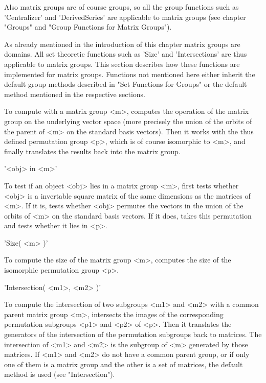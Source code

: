 Also matrix groups are  of course groups, so all the group functions such
as 'Centralizer' and 'DerivedSeries' are applicable to matrix groups (see
chapter "Groups" and "Group Functions for Matrix Groups").


As already  mentioned in the introduction of  this chapter matrix  groups
are   domains.    All   set  theoretic  functions  such   as  'Size'  and
'Intersections'  are  thus  applicable  to  matrix groups.   This section
describes  how  these  functions  are  implemented  for  matrix   groups.
Functions  not  mentioned here either  inherit the default  group methods
described  in "Set Functions for Groups" or the default  method mentioned
in the respective sections.

To compute with a matrix group <m>, {\GAP} computes  the operation of the
matrix group on the  underlying vector space (more precisely the union of
the orbits of the parent of <m>  on the standard basis vectors).  Then it
works with the  thus  defined permutation group  <p>,  which is of course
isomorphic  to  <m>, and  finally  translates  the  results back into the
matrix group.

\vspace{5mm}
'<obj> in <m>'

To test if an object <obj> lies in a matrix group <m>, {\GAP} first tests
whether <obj> is a invertable square matrix of the same dimensions as the
matrices of  <m>.   If  it is, {\GAP} tests  whether  <obj> permutes  the
vectors in  the union of the orbits of <m> on the standard basis vectors.
If it does,  {\GAP}  takes this permutation and tests whether it lies  in
<p>.

\vspace{5mm}
'Size( <m> )'

To compute the size of the matrix group <m>, {\GAP} computes the size  of
the isomorphic permutation group <p>.

\vspace{5mm}
'Intersection( <m1>, <m2> )'

To compute the intersection of two subgroups  <m1> and <m2> with a common
parent  matrix   group  <m>,   {\GAP}   intersects  the  images  of   the
corresponding  permutation subgroups  <p1>  and <p2>  of  <p>.   Then  it
translates  the  generators  of   the  intersection  of  the  permutation
subgroups  back to matrices.  The  intersection of  <m1> and  <m2> is the
subgroup  of  <m> generated  by those matrices.   If <m1> and <m2> do not
have a common parent group, or if only one  of them is a matrix group and
the  other  is a  set of  matrices,  the  default  method  is  used  (see
"Intersection").

